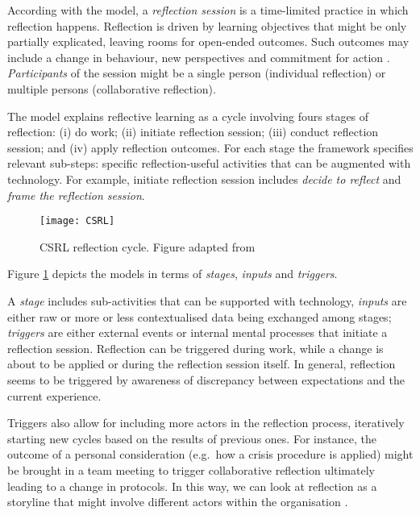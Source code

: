 According with the model, a \emph{reflection session} is a time-limited
practice in which reflection happens. Reflection is driven by learning
objectives that might be only partially explicated, leaving rooms for
open-ended outcomes. Such outcomes may include a change in behaviour,
new perspectives and commitment for action
\autocite{boud1985reflection}. \emph{Participants} of the session might
be a single person (individual reflection) or multiple persons
(collaborative reflection).

The model explains reflective learning as a cycle involving fours stages
of reflection: (i) do work; (ii) initiate reflection session; (iii)
conduct reflection session; and (iv) apply reflection outcomes. For each
stage the framework specifies relevant sub-steps: specific
reflection-useful activities that can be augmented with technology. For
example, initiate reflection session includes \emph{decide to reflect}
and \emph{frame the reflection session}.

\begin{figure}[tbh]
    \centering
    \texttt{[image: CSRL]}
    \caption{CSRL reflection cycle. Figure adapted from \protect\cite{Krogstie:2013kf}}
    \label{fig:csrl-model}
\end{figure}

Figure \ref{fig:csrl-model} depicts the models in terms of
\emph{stages}, \emph{inputs} and \emph{triggers}.

A \emph{stage} includes sub-activities that can be supported with
technology, \emph{inputs} are either raw or more or less contextualised
data being exchanged among stages; \emph{triggers} are either external
events or internal mental processes that initiate a reflection session.
Reflection can be triggered during work, while a change is about to be
applied or during the reflection session itself. In general, reflection
seems to be triggered by awareness of discrepancy between expectations
and the current experience.

Triggers also allow for including more actors in the reflection process,
iteratively starting new cycles based on the results of previous ones.
For instance, the outcome of a personal consideration (e.g.~how a crisis
procedure is applied) might be brought in a team meeting to trigger
collaborative reflection ultimately leading to a change in protocols. In
this way, we can look at reflection as a storyline that might involve
different actors within the organisation \autocite{PrPK13}.


